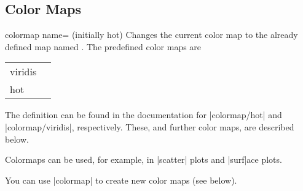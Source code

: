 \subsection{Color Maps}
\label{pgfplots:colormap}
\begin{pgfplotskey}{colormap name= (initially hot)}
	Changes the current color map to the already defined map named . The predefined color maps are

	\begin{tabular}{>{\ttfamily}ll}
	viridis & \pgfplotsshowcolormap{viridis}\\
	hot & \pgfplotsshowcolormap{hot}\\
	\end{tabular}

	The definition can be found in the documentation for |colormap/hot| and |colormap/viridis|, respectively. 
	These, and further color maps, are described below.

	Colormaps can be used, for example, in |scatter| plots and |surf|ace plots.

	You can use |colormap| to create new color maps (see below).
\end{pgfplotskey}


